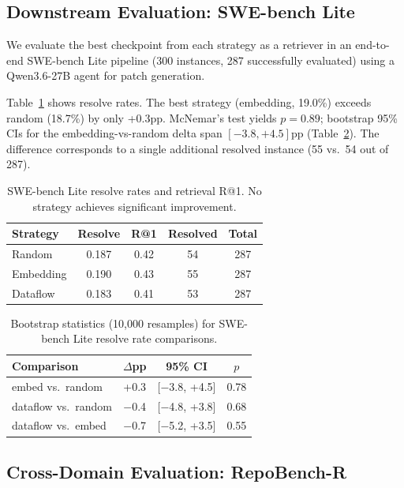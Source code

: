 \documentclass[11pt,a4paper]{article}
\begin{document}
\subsection{Downstream Evaluation: SWE-bench Lite}
\label{sec:swebench}

We evaluate the best checkpoint from each strategy as a retriever in an end-to-end SWE-bench Lite pipeline (300 instances, 287 successfully evaluated) using a Qwen3.6-27B agent for patch generation.

Table~\ref{tab:swebench} shows resolve rates.
The best strategy (embedding, 19.0\%) exceeds random (18.7\%) by only +0.3pp.
McNemar's test yields $p = 0.89$; bootstrap 95\% CIs for the embedding-vs-random delta span $[-3.8, +4.5]$pp (Table~\ref{tab:bootstrap}).
The difference corresponds to a single additional resolved instance (55 vs.\ 54 out of 287).

\begin{table}[t]
\centering
\small
\caption{SWE-bench Lite resolve rates and retrieval R@1. No strategy achieves significant improvement.}
\label{tab:swebench}
\begin{tabular}{lcccc}
\toprule
Strategy & Resolve & R@1 & Resolved & Total \\
\midrule
Random           & 0.187 & 0.42 & 54 & 287 \\
Embedding        & 0.190 & 0.43 & 55 & 287 \\
Dataflow         & 0.183 & 0.41 & 53 & 287 \\
\bottomrule
\end{tabular}
\end{table}

\begin{table}[t]
\centering
\small
\caption{Bootstrap statistics (10,000 resamples) for SWE-bench Lite resolve rate comparisons.}
\label{tab:bootstrap}
\begin{tabular}{lccc}
\toprule
Comparison & $\Delta$pp & 95\% CI & $p$ \\
\midrule
embed vs.\ random   & +0.3 & [$-$3.8, +4.5] & 0.78 \\
dataflow vs.\ random & $-$0.4 & [$-$4.8, +3.8] & 0.68 \\
dataflow vs.\ embed  & $-$0.7 & [$-$5.2, +3.5] & 0.55 \\
\bottomrule
\end{tabular}
\end{table}

\subsection{Cross-Domain Evaluation: RepoBench-R}
\label{sec:repobench}
\end{document}
